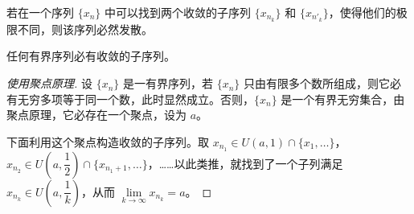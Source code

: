 \begin{theorem}
	若在一个序列 $\{x_n\}$ 中可以找到两个收敛的子序列 $\{x_{n_k}\}$ 和 $\{x_{n'_k}\}$，使得他们的极限不同，则该序列必然发散。
\end{theorem}

\begin{theorem}[BW 定理]
	任何有界序列必有收敛的子序列。
\end{theorem}

\begin{proof}[使用聚点原理]
	设 $\{x_n\}$ 是一有界序列，若 $\{x_n\}$ 只由有限多个数所组成，则它必有无穷多项等于同一个数，此时显然成立。否则，$\{x_n\}$ 是一个有界无穷集合，由聚点原理，它必存在一个聚点，设为 $a$。

	下面利用这个聚点构造收敛的子序列。取 $x_{n_1} \in U(a, 1) \cap \{x_1, \ldots\}$，$x_{n_2} \in U \left( a, \dfrac{1}{2} \right) \cap \{x_{n_1 + 1}, \ldots\}$，……以此类推，就找到了一个子列满足 $x_{n_k} \in U \left( a, \dfrac{1}{k} \right)$，从而 $\lim\limits_{k \rightarrow \infty} x_{n_k} = a$。
\end{proof}